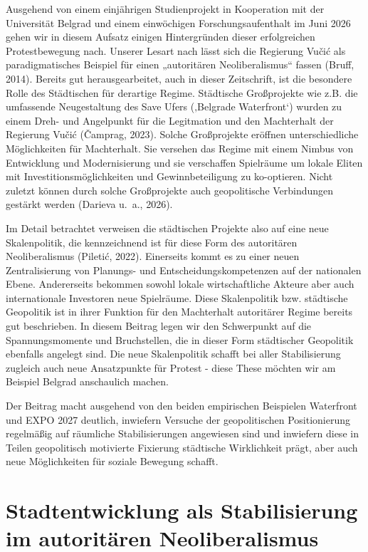 \documentclass[
  ngerman,
]{agujournal2019}
\begin{document}
Ausgehend von einem einjährigen Studienprojekt in Kooperation mit der
Universität Belgrad und einem einwöchigen Forschungsaufenthalt im Juni
2026 gehen wir in diesem Aufsatz einigen Hintergründen dieser
erfolgreichen Protestbewegung nach. Unserer Lesart nach lässt sich die
Regierung Vučić als paradigmatisches Beispiel für einen „autoritären
Neoliberalismus`` fassen (Bruff, 2014). Bereits gut herausgearbeitet,
auch in dieser Zeitschrift, ist die besondere Rolle des Städtischen für
derartige Regime. Städtische Großprojekte wie z.B. die umfassende
Neugestaltung des Save Ufers (‚Belgrade Waterfront`) wurden zu einem
Dreh- und Angelpunkt für die Legitmation und den Machterhalt der
Regierung Vučić (Čamprag, 2023). Solche Großprojekte eröffnen
unterschiedliche Möglichkeiten für Machterhalt. Sie versehen das Regime
mit einem Nimbus von Entwicklung und Modernisierung und sie verschaffen
Spielräume um lokale Eliten mit Investitionsmöglichkeiten und
Gewinnbeteiligung zu ko-optieren. Nicht zuletzt können durch solche
Großprojekte auch geopolitische Verbindungen gestärkt werden (Darieva
u.~a., 2026).

Im Detail betrachtet verweisen die städtischen Projekte also auf eine
neue Skalenpolitik, die kennzeichnend ist für diese Form des autoritären
Neoliberalismus (Piletić, 2022). Einerseits kommt es zu einer neuen
Zentralisierung von Planungs- und Entscheidungskompetenzen auf der
nationalen Ebene. Andererseits bekommen sowohl lokale wirtschaftliche
Akteure aber auch internationale Investoren neue Spielräume. Diese
Skalenpolitik bzw. städtische Geopolitik ist in ihrer Funktion für den
Machterhalt autoritärer Regime bereits gut beschrieben. In diesem
Beitrag legen wir den Schwerpunkt auf die Spannungsmomente und
Bruchstellen, die in dieser Form städtischer Geopolitik ebenfalls
angelegt sind. Die neue Skalenpolitik schafft bei aller Stabilisierung
zugleich auch neue Ansatzpunkte für Protest - diese These möchten wir am
Beispiel Belgrad anschaulich machen.

Der Beitrag macht ausgehend von den beiden empirischen Beispielen
Waterfront und EXPO 2027 deutlich, inwiefern Versuche der geopolitischen
Positionierung regelmäßig auf räumliche Stabilisierungen angewiesen sind
und inwiefern diese in Teilen geopolitisch motivierte Fixierung
städtische Wirklichkeit prägt, aber auch neue Möglichkeiten für soziale
Bewegung schafft.

\section{Stadtentwicklung als Stabilisierung im autoritären
Neoliberalismus}\label{sec-hintergrund}
\end{document}
